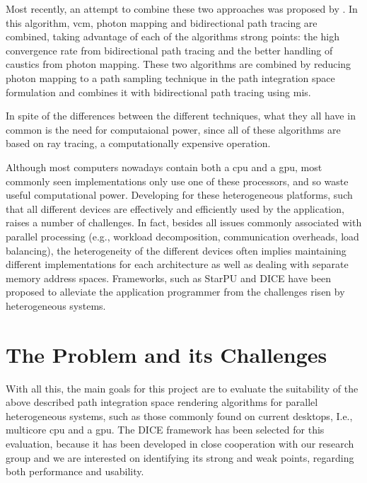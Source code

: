 Most recently, an attempt to combine these two approaches was proposed by \cite{Georgiev}. In this algorithm, \gls{vcm}, photon mapping and bidirectional path tracing are combined, taking advantage of each of the algorithms strong points: the high convergence rate from bidirectional path tracing and the better handling of caustics from photon mapping. These two algorithms are combined by reducing photon mapping to a path sampling technique in the path integration space formulation and combines it with bidirectional path tracing using \gls{mis}.

In spite of the differences between the different techniques, what they all have in common is the need for computaional power, since all of these algorithms are based on ray tracing, a computationally expensive operation.

Although most computers nowadays contain both a \gls{cpu} and a \gls{gpu}, most commonly seen implementations only use one of these processors, and so waste useful computational power. Developing for these heterogeneous platforms, such that all different devices are effectively and efficiently used by the application, raises a number of challenges. In fact, besides all issues commonly associated with parallel processing (e.g., workload decomposition, communication overheads, load balancing), the heterogeneity of the different devices often implies maintaining different implementations for each architecture as well as dealing with separate memory address spaces.
Frameworks, such as StarPU \citep{augonnet2011starpu} and DICE \citep{Barbosa} have been proposed to alleviate the application programmer from the challenges risen by heterogeneous systems. 

\section{The Problem and its Challenges}


With all this, the main goals for this project are to evaluate the suitability of the above described path integration space rendering algorithms for parallel heterogeneous systems, such as those commonly found on current desktops, I.e., multicore \gls{cpu} and a \gls{gpu}. The DICE framework has been selected for this evaluation, because it has been developed in close cooperation with our research group and we are interested on identifying its strong and weak points, regarding both performance and usability.
